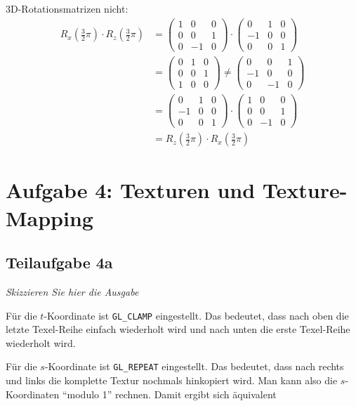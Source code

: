 \documentclass[a4paper]{scrartcl}
\begin{document}
3D-Rotationsmatrizen nicht:
\begin{align}
R_x(\frac{3}{2}\pi) \cdot R_z(\frac{3}{2}\pi)
&= \begin{pmatrix}1 & 0 & 0\\ 0 & 0 & 1\\0 & -1 & 0\end{pmatrix} \cdot
  \begin{pmatrix}0 & 1 & 0\\-1 & 0 & 0\\0 &  0 & 1\end{pmatrix} \\
 &=
  \begin{pmatrix}0 & 1 & 0\\ 0 & 0 & 1\\1 &  0 & 0\end{pmatrix} \neq
  \begin{pmatrix}0 & 0 & 1\\-1 & 0 & 0\\0 & -1 & 0\end{pmatrix} \\
 &=
  \begin{pmatrix}0 & 1 & 0\\-1 & 0 & 0\\0 &  0 & 1\end{pmatrix} \cdot
  \begin{pmatrix}1 & 0 & 0\\ 0 & 0 & 1\\0 & -1 & 0\end{pmatrix} \\
 &= R_z(\frac{3}{2}\pi) \cdot R_x(\frac{3}{2}\pi)
\end{align}

\section*{Aufgabe 4: Texturen und Texture-Mapping}
\subsection*{Teilaufgabe 4a}
\textit{Skizzieren Sie hier die Ausgabe}

Für die $t$-Koordinate ist \texttt{GL\_CLAMP} eingestellt. Das bedeutet, dass
nach oben die letzte Texel-Reihe einfach wiederholt wird und nach unten die
erste Texel-Reihe wiederholt wird.

Für die $s$-Koordinate ist \texttt{GL\_REPEAT} eingestellt. Das bedeutet, dass
nach rechts und links die komplette Textur nochmals hinkopiert wird. Man kann
also die $s$-Koordinaten \enquote{modulo 1} rechnen. Damit ergibt sich
äquivalent
\end{document}
